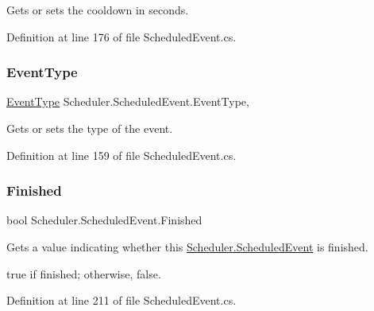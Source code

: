 Gets or sets the cooldown in seconds. 



Definition at line 176 of file Scheduled\+Event.\+cs.

\mbox{\label{class_scheduler_1_1_scheduled_event_ae2c9cdd783bf0874e5d2e8758dab70ba}} 
\subsubsection{\texorpdfstring{Event\+Type}{EventType}}
{\footnotesize\ttfamily \hyperlink{namespace_scheduler_a85a4e27de37756a9765a49f3b3e4ba81}{Event\+Type} Scheduler.\+Scheduled\+Event.\+Event\+Type\hspace{0.3cm}{\ttfamily [get]}, {}}



Gets or sets the type of the event. 



Definition at line 159 of file Scheduled\+Event.\+cs.

\mbox{\label{class_scheduler_1_1_scheduled_event_a18809036499636d4629da4d803c74637}} 
\subsubsection{\texorpdfstring{Finished}{Finished}}
{\footnotesize\ttfamily bool Scheduler.\+Scheduled\+Event.\+Finished\hspace{0.3cm}{\ttfamily [get]}}



Gets a value indicating whether this \hyperlink{class_scheduler_1_1_scheduled_event}{Scheduler.\+Scheduled\+Event} is finished. 

{\ttfamily true} if finished; otherwise, {\ttfamily false}.

Definition at line 211 of file Scheduled\+Event.\+cs.

\mbox{\label{class_scheduler_1_1_scheduled_event_a4ea0964dccdd458ff883edce11d6fac6}} 
